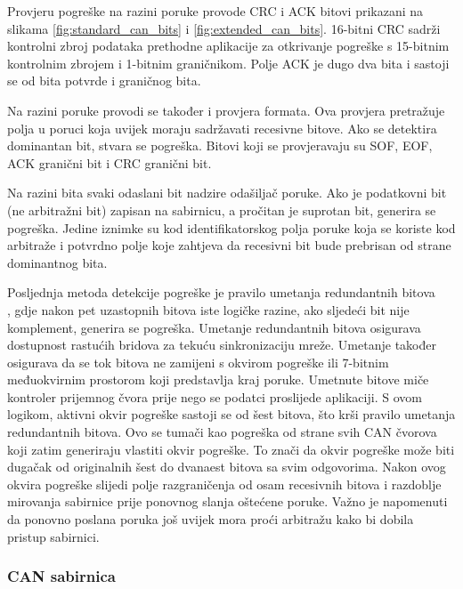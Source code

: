 Provjeru pogreške na razini poruke provode CRC i ACK bitovi prikazani na slikama \ref{fig:standard_can_bits} i \ref{fig:extended_can_bits}. 16-bitni CRC sadrži kontrolni zbroj podataka prethodne aplikacije za otkrivanje pogreške s 15-bitnim kontrolnim zbrojem i 1-bitnim graničnikom. Polje ACK je dugo dva bita i sastoji se od bita potvrde i graničnog bita.

Na razini poruke provodi se također i provjera formata. Ova provjera pretražuje polja u poruci koja uvijek moraju sadržavati recesivne bitove. Ako se detektira dominantan bit, stvara se pogreška. Bitovi koji se provjeravaju su SOF, EOF, ACK granični bit i CRC granični bit.

Na razini bita svaki odaslani bit nadzire odašiljač poruke. Ako je podatkovni bit (ne arbitražni bit) zapisan na sabirnicu, a pročitan je suprotan bit, generira se pogreška. Jedine iznimke su kod identifikatorskog polja poruke koja se koriste kod arbitraže i potvrdno polje koje zahtjeva da recesivni bit bude prebrisan od strane dominantnog bita.

Posljednja metoda detekcije pogreške je pravilo umetanja redundantnih bitova \\ , gdje nakon pet uzastopnih bitova iste logičke razine, ako sljedeći bit nije komplement, generira se pogreška. Umetanje redundantnih bitova osigurava dostupnost rastućih bridova za tekuću sinkronizaciju mreže. Umetanje također osigurava da se tok bitova ne zamijeni s okvirom pogreške ili 7-bitnim međuokvirnim prostorom koji predstavlja kraj poruke. Umetnute bitove miče kontroler prijemnog čvora prije nego se podatci proslijede aplikaciji. S ovom logikom, aktivni okvir pogreške sastoji se od šest bitova, što krši pravilo umetanja redundantnih bitova. Ovo se tumači kao pogreška od strane svih CAN čvorova koji zatim generiraju vlastiti okvir pogreške. To znači da okvir pogreške može biti dugačak od originalnih šest do dvanaest bitova sa svim odgovorima. Nakon ovog okvira pogreške slijedi polje razgraničenja od osam recesivnih bitova i razdoblje mirovanja sabirnice prije ponovnog slanja oštećene poruke. Važno je napomenuti da ponovno poslana poruka još uvijek mora proći arbitražu kako bi dobila pristup sabirnici.

\subsubsection{CAN sabirnica}

